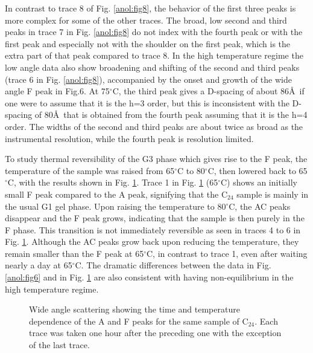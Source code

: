 In contrast to trace 8 of Fig. \ref{anol:fig8}, the behavior of the first three peaks
is more complex for some of the other traces.
The broad, low second and third peaks in trace 7 in Fig. \ref{anol:fig8} 
do not index with the fourth peak or with the first peak and especially
not with the shoulder on the first peak, which is the extra part of that
peak compared to trace 8.  In the high temperature regime the low angle data 
also show broadening and shifting of the second and third peaks
(trace 6 in Fig. \ref{anol:fig8}), accompanied by the onset and growth 
of the wide angle F peak in
Fig.6.  At 75$^{\circ}$C, the third peak gives a D-spacing of about 86\AA\ 
if one were to assume that it is the h=3 order, but this is inconsistent with
the D-spacing of 80\AA\ that is obtained from the fourth peak assuming that 
it is
the h=4 order.  The widths of the second and third peaks are about twice as
broad as the instrumental resolution, while the fourth peak is resolution 
limited. 

To study thermal reversibility of the G3 phase which gives
rise to the F peak, the temperature of the sample was raised from 
65$^{\circ}$C to 
80$^{\circ}$C, then lowered back to 65$^{\circ}$C, with the results
shown in Fig. \ref{anol:fig9}.   Trace 1 in Fig. \ref{anol:fig9} 
(65$^{\circ}$C) shows an initially
small F peak compared to the A peak, signifying that the C$_{24}$ sample is 
mainly in the usual G1 gel phase. Upon raising the temperature to 
80$^{\circ}$C,
the AC peaks disappear and the F peak grows, indicating that the sample is 
then purely in the F phase. This transition is not immediately reversible as 
seen in traces 4 to 6 in Fig. \ref{anol:fig9}.  
Although the AC peaks grow back upon 
reducing the temperature, they remain smaller than the F peak at 65$^{\circ}$C,
in contrast to trace 1, even after waiting nearly a day at 65$^{\circ}$C.
The dramatic differences between the data in Fig. \ref{anol:fig6} 
and in Fig. \ref{anol:fig9} are also
consistent with having non-equilibrium in the high temperature regime.

\begin{figure}[t]
\centerline {}
\caption{Wide angle scattering showing the time and temperature dependence
of the A and F peaks for the same sample of C$_{24}$.
Each trace was taken one hour after the preceding one with the exception
of the last trace.
\label{anol:fig9}}
\end{figure}

